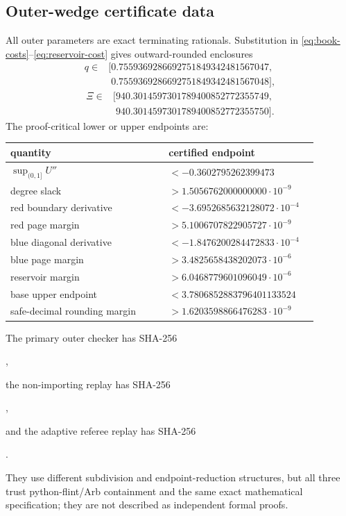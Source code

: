 \subsection{Outer-wedge certificate data}

All outer parameters are exact terminating rationals.  Substitution in
\eqref{eq:book-costs}--\eqref{eq:reservoir-cost} gives outward-rounded enclosures
\[
\begin{aligned}
 q\in{}&[0.7559369286692751849342481567047,\\
        &\phantom{[}0.7559369286692751849342481567048],
\end{aligned}
\]
\[
\begin{aligned}
 \Xi\in{}&[940.3014597301789400852772355749,\\
          &\phantom{[}940.3014597301789400852772355750].
\end{aligned}
\]
The proof-critical lower or upper endpoints are:
\begin{center}
\begin{tabular}{p{0.48\linewidth}p{0.40\linewidth}}
\toprule
quantity & certified endpoint\\
\midrule
\(\sup_{(0,1]}U''\) & \(<-0.3602795262399473\)\\
degree slack & \(>1.5056762000000000\cdot10^{-9}\)\\
red boundary derivative & \(<-3.6952685632128072\cdot10^{-4}\)\\
red page margin & \(>5.1006707822905727\cdot10^{-9}\)\\
blue diagonal derivative & \(<-1.8476200284472833\cdot10^{-4}\)\\
blue page margin & \(>3.4825658438202073\cdot10^{-6}\)\\
reservoir margin & \(>6.0468779601096049\cdot10^{-6}\)\\
base upper endpoint & \(<3.7806852883796401133524\)\\
safe-decimal rounding margin & \(>1.6203598866476283\cdot10^{-9}\)\\
\bottomrule
\end{tabular}
\end{center}
The primary outer checker has SHA-256
\begin{center}
,
\end{center}
the non-importing replay has SHA-256
\begin{center}
,
\end{center}
and the adaptive referee replay has SHA-256
\begin{center}
.
\end{center}
They use different subdivision and endpoint-reduction structures, but all
three trust python-flint/Arb containment and the same exact mathematical
specification; they are not described as independent formal proofs.
